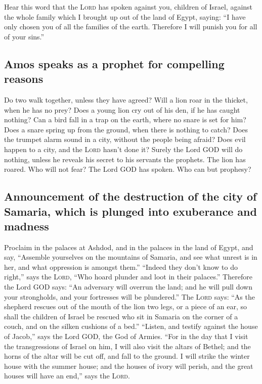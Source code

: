  Hear this word that the \textsc{Lord} has spoken against
you, children of Israel, against the whole family which I brought up out
of the land of Egypt, saying:  ``I have only chosen you of
all the families of the earth. Therefore I will punish you for all of
your sins.''

\hypertarget{amos-speaks-as-a-prophet-for-compelling-reasons}{%
\subsection{Amos speaks as a prophet for compelling
reasons}\label{amos-speaks-as-a-prophet-for-compelling-reasons}}

 Do two walk together, unless they have agreed?
 Will a lion roar in the thicket, when he has no prey?
Does a young lion cry out of his den, if he has caught nothing?
 Can a bird fall in a trap on the earth, where no snare is
set for him? Does a snare spring up from the ground, when there is
nothing to catch?  Does the trumpet alarm sound in a city,
without the people being afraid? Does evil happen to a city, and the
\textsc{Lord} hasn't done it?  Surely the Lord GOD will do
nothing, unless he reveals his secret to his servants the prophets.
 The lion has roared. Who will not fear? The Lord GOD has
spoken. Who can but prophesy?

\hypertarget{announcement-of-the-destruction-of-the-city-of-samaria-which-is-plunged-into-exuberance-and-madness}{%
\subsection{Announcement of the destruction of the city of Samaria,
which is plunged into exuberance and
madness}\label{announcement-of-the-destruction-of-the-city-of-samaria-which-is-plunged-into-exuberance-and-madness}}

 Proclaim in the palaces at Ashdod, and in the palaces in
the land of Egypt, and say, ``Assemble yourselves on the mountains of
Samaria, and see what unrest is in her, and what oppression is amongst
them.''  ``Indeed they don't know to do right,'' says the
\textsc{Lord}, ``Who hoard plunder and loot in their palaces.''
 Therefore the Lord GOD says: ``An adversary will overrun
the land; and he will pull down your strongholds, and your fortresses
will be plundered.''  The \textsc{Lord} says: ``As the
shepherd rescues out of the mouth of the lion two legs, or a piece of an
ear, so shall the children of Israel be rescued who sit in Samaria on
the corner of a couch, and on the silken cushions of a bed.''
 ``Listen, and testify against the house of Jacob,'' says
the Lord GOD, the God of Armies.  ``For in the day that I
visit the transgressions of Israel on him, I will also visit the altars
of Bethel; and the horns of the altar will be cut off, and fall to the
ground.  I will strike the winter house with the summer
house; and the houses of ivory will perish, and the great houses will
have an end,'' says the \textsc{Lord}.

